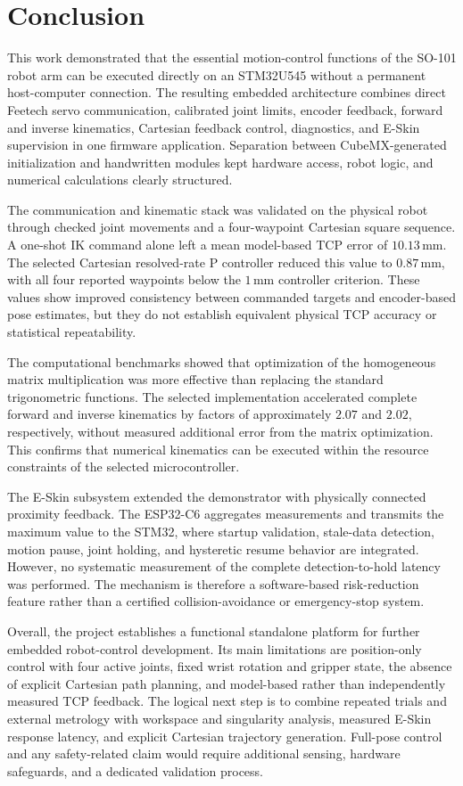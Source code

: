 \section{Conclusion}

This work demonstrated that the essential motion-control functions of the
SO-101 robot arm can be executed directly on an STM32U545 without a permanent
host-computer connection. The resulting embedded architecture combines direct
Feetech servo communication, calibrated joint limits, encoder feedback,
forward and inverse kinematics, Cartesian feedback control, diagnostics, and
E-Skin supervision in one firmware application. Separation between
CubeMX-generated initialization and handwritten modules kept hardware access,
robot logic, and numerical calculations clearly structured.

The communication and kinematic stack was validated on the physical robot
through checked joint movements and a four-waypoint Cartesian square sequence.
A one-shot IK command alone left a mean model-based TCP error of
\(10.13\,\mathrm{mm}\). The selected Cartesian resolved-rate P controller reduced
this value to \(0.87\,\mathrm{mm}\), with all four reported waypoints below the
\(1\,\mathrm{mm}\) controller criterion. These values show improved consistency
between commanded targets and encoder-based pose estimates, but they do not
establish equivalent physical TCP accuracy or statistical repeatability.

The computational benchmarks showed that optimization of the homogeneous
matrix multiplication was more effective than replacing the standard
trigonometric functions. The selected implementation accelerated complete
forward and inverse kinematics by factors of approximately \(2.07\) and
\(2.02\), respectively, without measured additional error from the matrix
optimization. This confirms that numerical kinematics can be executed within
the resource constraints of the selected microcontroller.

The E-Skin subsystem extended the demonstrator with physically connected
proximity feedback. The ESP32-C6 aggregates measurements and transmits the
maximum value to the STM32, where startup validation, stale-data detection,
motion pause, joint holding, and hysteretic resume behavior are integrated.
However, no systematic measurement of the complete detection-to-hold latency
was performed. The mechanism is therefore a software-based risk-reduction
feature rather than a certified collision-avoidance or emergency-stop system.

Overall, the project establishes a functional standalone platform for further
embedded robot-control development. Its main limitations are position-only
control with four active joints, fixed wrist rotation and gripper state, the
absence of explicit Cartesian path planning, and model-based rather than
independently measured TCP feedback. The logical next step is to combine
repeated trials and external metrology with workspace and singularity analysis,
measured E-Skin response latency, and explicit Cartesian trajectory generation.
Full-pose control and any safety-related claim would require additional sensing,
hardware safeguards, and a dedicated validation process.
